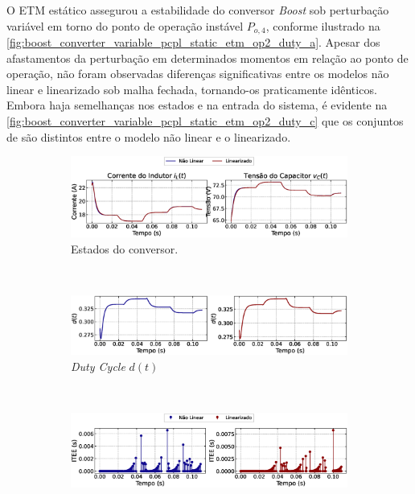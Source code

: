 O ETM estático assegurou a estabilidade do conversor \textit{Boost }sob perturbação variável em torno do ponto de operação instável $P_{o, 4}$, conforme ilustrado na \autoref{fig:boost_converter_variable_pcpl_static_etm_op2_duty_a}. Apesar dos afastamentos da perturbação em determinados momentos em relação ao ponto de operação, não foram observadas diferenças significativas entre os modelos não linear e linearizado sob malha fechada, tornando-os praticamente idênticos. Embora haja semelhanças nos estados e na entrada do sistema, é evidente na \autoref{fig:boost_converter_variable_pcpl_static_etm_op2_duty_c} que os conjuntos de  são distintos entre o modelo não linear e o linearizado.

\begin{figure}[H]
  \centering
  \captionsetup{justification=centering}
  \begin{subfigure}{1.\textwidth}
    \centering
    \includegraphics[width=1.\textwidth]{figuras/static-etm/boost/sim2/op2/result.eps}
    \caption{Estados do conversor.}
    \label{fig:boost_converter_variable_pcpl_static_etm_op2_duty_a}
  \end{subfigure}
  \\[6pt]
  \begin{subfigure}{1.\textwidth}
    \centering
    \includegraphics[width=1.\textwidth]{figuras/static-etm/boost/sim2/op2/duty-cycle.eps}
    \caption{\textit{Duty Cycle} $d(t)$}
    \label{fig:boost_converter_variable_pcpl_static_etm_op2_duty_b}
  \end{subfigure}
  \\[6pt]
  \begin{subfigure}{1.\textwidth}
    \centering
    \includegraphics[width=1.\textwidth]{figuras/static-etm/boost/sim2/op2/inter-event-times.eps}

\end{subfigure}
\end{figure}

